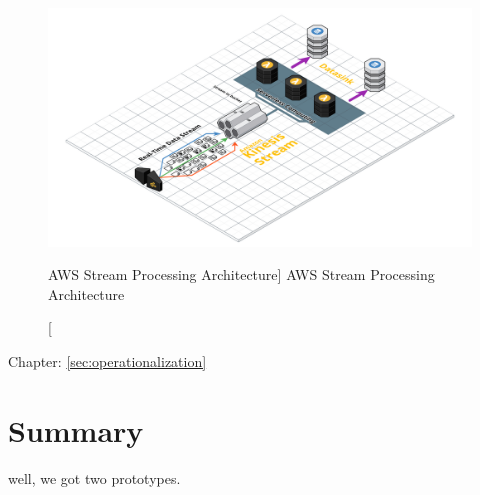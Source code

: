 \begin{figure}[ht]
    \includegraphics[width=\linewidth]{images/streaming/streamingaws.png}\centering
    \caption
    [AWS Stream Processing Architecture]
    {AWS Stream Processing Architecture}
    \label{fig:awsStreamingArchitecture}
\end{figure}

Chapter: \ref{sec:operationalization}




\section{Summary}

well, we got two prototypes.